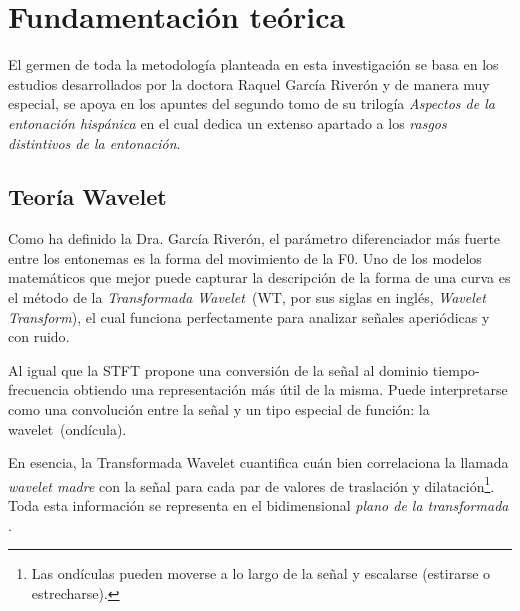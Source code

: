 \chapter{Fundamentaci\'on te\'orica} 
El germen de toda la metodolog\'ia planteada en esta investigaci\'on se basa en los estudios desarrollados 
por la doctora Raquel Garc\'ia River\'on y de manera muy especial, se apoya en los apuntes del segundo tomo de 
su trilog\'ia \emph{Aspectos de la entonaci{\'o}n hisp{\'a}nica}  \cite[cap\'itulo II]{garcia1996aspectos2} en el 
cual dedica un extenso apartado a los \emph{rasgos distintivos de la entonaci\'on}.

\section{Teor\'ia Wavelet} \label{wavelet_theory}
Como ha definido la Dra. Garc\'ia River\'on, el par\'ametro diferenciador m\'as fuerte entre los entonemas es la forma del movimiento de la F0. Uno de los modelos matem\'aticos que mejor puede capturar la descripci\'on de la forma de una curva es el m\'etodo de la \emph{Transformada Wavelet}~(WT, por sus siglas en ingl\'es, \emph{Wavelet Transform}), el cual funciona perfectamente para analizar se\~nales aperi\'odicas y con ruido\cite{addison2017illustrated}.


Al igual que la STFT propone una conversi\'on de la se\~nal al dominio tiempo-frecuencia \cite[p.99]{sundararajan2016discrete} obtiendo una representaci\'on m\'as \'util de la misma. Puede interpretarse como una convoluci\'on entre la se\~nal y un tipo especial de funci\'on: la wavelet~(ond\'icula).



En esencia, la Transformada Wavelet cuantifica cu\'an bien correlaciona la llamada \emph{wavelet madre} \cite[p.27]{debnath2002wavelet} con la se\~nal para cada par de valores de traslaci\'on y dilataci\'on\footnote{Las ond\'iculas pueden moverse a lo largo de la se\~nal y escalarse (estirarse o estrecharse).}. Toda esta informaci\'on se representa en el bidimensional \emph{plano de la transformada} \cite[p.3]{addison2017illustrated}.

